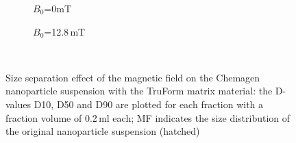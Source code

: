 \begin{figure}
          \begin{subfigure}{0.49\textwidth}
                  \flushleft
                  \caption{$B_{0}$=0mT}\label{subfig:chemagen_size_0mT}
          \end{subfigure}\hfill
        \begin{subfigure}{0.49\textwidth}
                \flushright
                \caption{$B_{0}$=12.8\,mT}\label{subfig:chemagen_size_128mT}
        \end{subfigure}
        \\        
        \caption[Size separation effect of the magnetic field on the Chemagen nanoparticle suspension with the TruForm matrix material]{Size separation effect of the magnetic field on the Chemagen nanoparticle suspension with the TruForm matrix material: the D-values D10, D50 and D90 are plotted for each fraction with a fraction volume of 0.2\,ml each; MF indicates the size distribution of the original nanoparticle suspension (hatched)}
        \label{fig:chemagen_size_separation}
  \end{figure}
  
